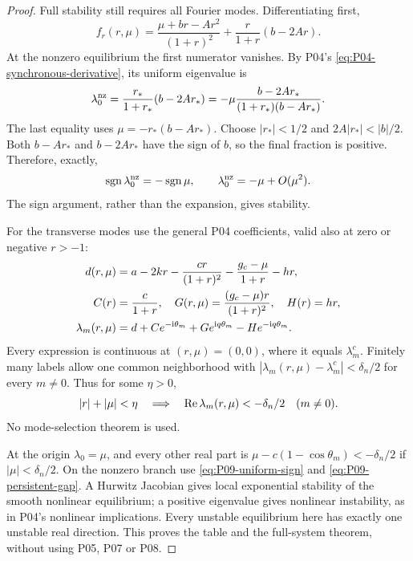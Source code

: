 \begin{proof}
Full stability still requires all Fourier modes. Differentiating first,
\[
 f_r(r,\mu)=\frac{\mu+br-Ar^2}{(1+r)^2}
                  +\frac r{1+r}(b-2Ar).
\]
At the nonzero equilibrium the first numerator vanishes. By P04's
\eqref{eq:P04-synchronous-derivative}, its uniform eigenvalue is
\begin{equation}
 \lambda_0^{\rm nz}=\frac{r_*}{1+r_*}(b-2Ar_*)
 =-\mu\frac{b-2Ar_*}{(1+r_*)(b-Ar_*)}.
 \label{eq:P09-uniform-nonzero}
\end{equation}
The last equality uses $\mu=-r_*(b-Ar_*)$. Choose $|r_*|<1/2$ and
$2A|r_*|<|b|/2$. Both $b-Ar_*$ and $b-2Ar_*$ have the sign of
$b$, so the final fraction is positive. Therefore, exactly,
\begin{equation}
 \operatorname{sgn}\lambda_0^{\rm nz}=-\operatorname{sgn}\mu,
 \qquad\lambda_0^{\rm nz}=-\mu+O(\mu^2).
 \label{eq:P09-uniform-sign}
\end{equation}
The sign argument, rather than the expansion, gives stability.

For the transverse modes use the general P04 coefficients, valid also
at zero or negative $r>-1$:
\begin{align}
 d(r,\mu)&=a-2kr-\frac{cr}{(1+r)^2}-\frac{g_c-\mu}{1+r}-hr,
 \notag\\
 C(r)&=\frac c{1+r},\quad G(r,\mu)=\frac{(g_c-\mu)r}{(1+r)^2},
 \quad H(r)=hr,\notag\\
 \lambda_m(r,\mu)&=d+Ce^{-\mathrm{i}\theta_m}+Ge^{\mathrm{i} q\theta_m}
                                      -He^{-\mathrm{i} q\theta_m}.
 \label{eq:P09-continuous-spectrum}
\end{align}
Every expression is continuous at $(r,\mu)=(0,0)$, where it equals
$\lambda_m^c$. Finitely many labels allow one common neighborhood
with $|\lambda_m(r,\mu)-\lambda_m^c|<\delta_n/2$ for every $m\ne0$.
Thus for some $\eta>0$,
\begin{equation}
 |r|+|\mu|<\eta\quad\Longrightarrow\quad
 \operatorname{Re}\lambda_m(r,\mu)<-\delta_n/2\quad(m\ne0).
 \label{eq:P09-persistent-gap}
\end{equation}
No mode-selection theorem is used.

At the origin $\lambda_0=\mu$, and every other real part is
$\mu-c(1-\cos\theta_m)<-\delta_n/2$ if $|\mu|<\delta_n/2$.
On the nonzero branch use \eqref{eq:P09-uniform-sign} and
\eqref{eq:P09-persistent-gap}. A Hurwitz Jacobian gives local exponential
stability of the smooth nonlinear equilibrium; a positive eigenvalue
gives nonlinear instability, as in P04's nonlinear implications.
Every unstable equilibrium here has exactly one unstable real direction.
This proves the table and the full-system theorem, without using P05,
P07 or P08.
\end{proof}

